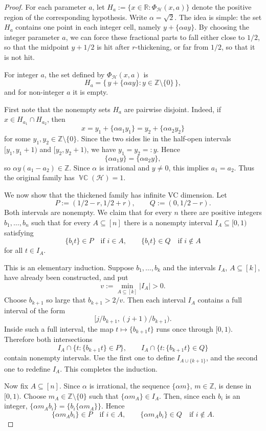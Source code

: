 \documentclass[11pt]{article}
\theoremstyle{plain}
\theoremstyle{definition}
\theoremstyle{remark}
\DeclareMathOperator{\VCdim}{\mathbb{VC}}
\newcommand{\R}{\mathbb{R}}
\newcommand{\Z}{\mathbb{Z}}
\begin{document}
\begin{proof}
For each parameter \(a\), let $H_a:=\{x\in\R:\Phi_{\mathcal H}(x,a)\}$ denote the positive region of the corresponding hypothesis.
Write \(\alpha=\sqrt2\). The idea is simple: the set \(H_a\) contains one point
in each integer cell, namely \(y+\{\alpha ay\}\). By choosing the integer
parameter \(a\), we can force these fractional parts to fall either close to
\(1/2\), so that the midpoint \(y+1/2\) is hit after \(r\)-thickening, or far
from \(1/2\), so that it is not hit.

For integer \(a\), the set defined by \(\Phi_{\mathcal H}(x,a)\) is
\[
H_a=\{\,y+\{\alpha ay\}:y\in\Z\setminus\{0\}\,\},
\]
and for non-integer \(a\) it is empty.

First note that the nonempty sets \(H_a\) are pairwise disjoint. Indeed, if
\(x\in H_{a_1}\cap H_{a_2}\), then
\[
x=y_1+\{\alpha a_1y_1\}
 =
y_2+\{\alpha a_2y_2\}
\]
for some \(y_1,y_2\in\Z\setminus\{0\}\). Since the two sides lie in the
half-open intervals \([y_1,y_1+1)\) and \([y_2,y_2+1)\), we have
\(y_1=y_2=:y\). Hence
\[
\{\alpha a_1y\}=\{\alpha a_2y\},
\]
so \(\alpha y(a_1-a_2)\in\Z\). Since \(\alpha\) is irrational and
\(y\neq 0\), this implies \(a_1=a_2\). Thus the original family has
\(\VCdim(\mathcal H)=1\).

We now show that the thickened family has infinite VC dimension. Let
\[
P:=(1/2-r,1/2+r),
\qquad
Q:=(0,1/2-r).
\]
Both intervals are nonempty. We claim that for every \(n\) there are positive
integers \(b_1,\ldots,b_n\) such that for every \(A\subseteq[n]\) there is a
nonempty interval \(I_A\subseteq[0,1)\) satisfying
\[
\{b_i t\}\in P \quad\text{if } i\in A,
\qquad
\{b_i t\}\in Q \quad\text{if } i\notin A
\]
for all \(t\in I_A\).

This is an elementary induction. Suppose \(b_1,\ldots,b_k\) and the intervals
\(I_A\), \(A\subseteq[k]\), have already been constructed, and put
\[
v:=\min_{A\subseteq[k]} |I_A|>0.
\]
Choose \(b_{k+1}\) so large that \(b_{k+1}>2/v\). Then each interval \(I_A\)
contains a full interval of the form
\[
[j/b_{k+1},(j+1)/b_{k+1}).
\]
Inside such a full interval, the map \(t\mapsto \{b_{k+1}t\}\) runs once through
\([0,1)\). Therefore both intersections
\[
I_A\cap\{t:\{b_{k+1}t\}\in P\},
\qquad
I_A\cap\{t:\{b_{k+1}t\}\in Q\}
\]
contain nonempty intervals. Use the first one to define
\(I_{A\cup\{k+1\}}\), and the second one to redefine \(I_A\). This completes
the induction.

Now fix \(A\subseteq[n]\). Since \(\alpha\) is irrational, the sequence
\(\{\alpha m\}\), \(m\in\Z\), is dense in \([0,1)\). Choose
\(m_A\in\Z\setminus\{0\}\) such that $\{\alpha m_A\}\in I_A$. Then, since each \(b_i\) is an integer,
\(
\{\alpha m_A b_i\}
=
\{b_i\{\alpha m_A\}\}.
\)
Hence
\[
\{\alpha m_A b_i\}\in P \quad\text{if } i\in A,
\qquad
\{\alpha m_A b_i\}\in Q \quad\text{if } i\notin A.
\]


\end{proof}
\end{document}
